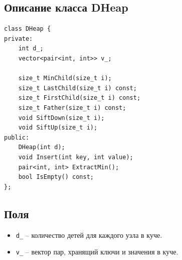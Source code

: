 \subsection{Описание класса DHeap}
\begin{verbatim}
class DHeap {
private:
    int d_;
    vector<pair<int, int>> v_;

    size_t MinChild(size_t i);
    size_t LastChild(size_t i) const;
    size_t FirstChild(size_t i) const;
    size_t Father(size_t i) const;
    void SiftDown(size_t i);
    void SiftUp(size_t i);
public:
    DHeap(int d);
    void Insert(int key, int value);
    pair<int, int> ExtractMin();
    bool IsEmpty() const;
};
\end{verbatim}

\subsection*{Поля}

\begin{itemize}
    \item \texttt{d\_} -- количество детей для каждого узла в куче.
    \item \texttt{v\_} -- вектор пар, хранящий ключи и значения в куче.
\end{itemize}

